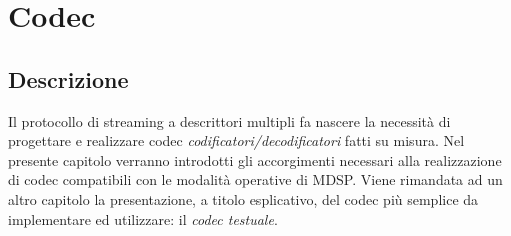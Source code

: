 \chapter{Codec}
\section{Descrizione}
\label{cap:descrizione_codec}
Il protocollo di streaming a descrittori multipli fa nascere la necessit\`a di progettare e realizzare codec \emph{codificatori/decodificatori} fatti su misura. Nel presente capitolo verranno introdotti gli accorgimenti necessari alla realizzazione di codec compatibili con le modalit\`a operative di MDSP. Viene rimandata ad un altro capitolo la presentazione, a titolo esplicativo, del codec pi\`u semplice da implementare ed utilizzare: il \emph{codec testuale}.

